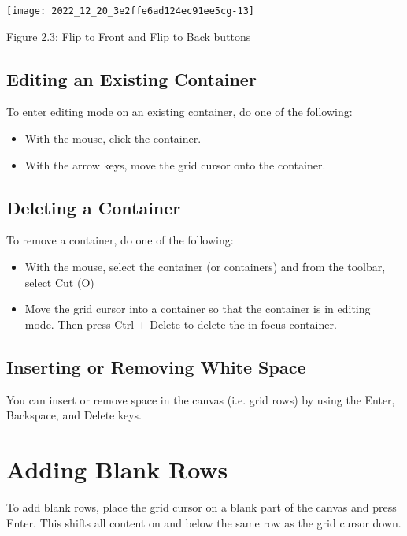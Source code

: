 \begin{center}
\texttt{[image: 2022\_12\_20\_3e2ffe6ad124ec91ee5cg-13]}
\end{center}

Figure 2.3: Flip to Front and Flip to Back buttons

\subsection{Editing an Existing Container}
To enter editing mode on an existing container, do one of the following:

\begin{itemize}
  \item With the mouse, click the container.

  \item With the arrow keys, move the grid cursor onto the container.

\end{itemize}

\subsection{Deleting a Container}
To remove a container, do one of the following:

\begin{itemize}
  \item With the mouse, select the container (or containers) and from the toolbar, select Cut (O)

  \item Move the grid cursor into a container so that the container is in editing mode. Then press Ctrl + Delete to delete the in-focus container.

\end{itemize}

\subsection{Inserting or Removing White Space}
You can insert or remove space in the canvas (i.e. grid rows) by using the Enter, Backspace, and Delete keys.

\section{Adding Blank Rows}
To add blank rows, place the grid cursor on a blank part of the canvas and press Enter. This shifts all content on and below the same row as the grid cursor down.

